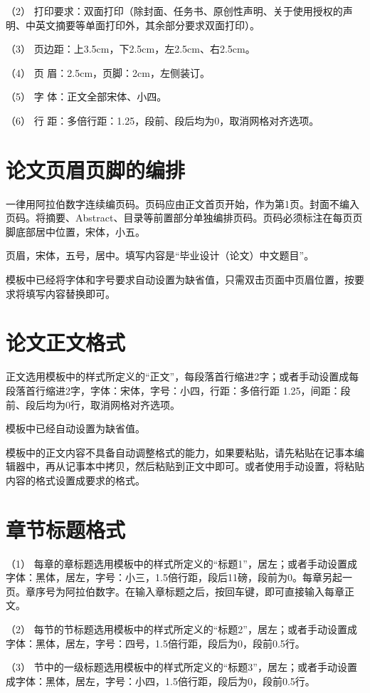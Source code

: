 （2） 打印要求：双面打印（除封面、任务书、原创性声明、关于使用授权的声明、中英文摘要等单面打印外，其余部分要求双面打印）。

（3） 页边距：上3.5cm，下2.5cm，左2.5cm、右2.5cm。

（4） 页  眉：2.5cm，页脚：2cm，左侧装订。

（5） 字  体：正文全部宋体、小四。

（6） 行  距：多倍行距：1.25，段前、段后均为0，取消网格对齐选项。

\section{论文页眉页脚的编排}
一律用阿拉伯数字连续编页码。页码应由正文首页开始，作为第1页。封面不编入页码。将摘要、Abstract、目录等前置部分单独编排页码。页码必须标注在每页页脚底部居中位置，宋体，小五。

页眉，宋体，五号，居中。填写内容是“毕业设计（论文）中文题目”。

模板中已经将字体和字号要求自动设置为缺省值，只需双击页面中页眉位置，按要求将填写内容替换即可。

\section{论文正文格式}
正文选用模板中的样式所定义的“正文”，每段落首行缩进2字；或者手动设置成每段落首行缩进2字，字体：宋体，字号：小四，行距：多倍行距 1.25，间距：段前、段后均为0行，取消网格对齐选项。

模板中已经自动设置为缺省值。

模板中的正文内容不具备自动调整格式的能力，如果要粘贴，请先粘贴在记事本编辑器中，再从记事本中拷贝，然后粘贴到正文中即可。或者使用手动设置，将粘贴内容的格式设置成要求的格式。

\section{章节标题格式}
（1） 每章的章标题选用模板中的样式所定义的“标题1”，居左；或者手动设置成字体：黑体，居左，字号：小三，1.5倍行距，段后11磅，段前为0。每章另起一页。章序号为阿拉伯数字。在输入章标题之后，按回车键，即可直接输入每章正文。

（2） 每节的节标题选用模板中的样式所定义的“标题2”，居左；或者手动设置成字体：黑体，居左，字号：四号，1.5倍行距，段后为0，段前0.5行。

（3） 节中的一级标题选用模板中的样式所定义的“标题3”，居左；或者手动设置成字体：黑体，居左，字号：小四，1.5倍行距，段后为0，段前0.5行。

